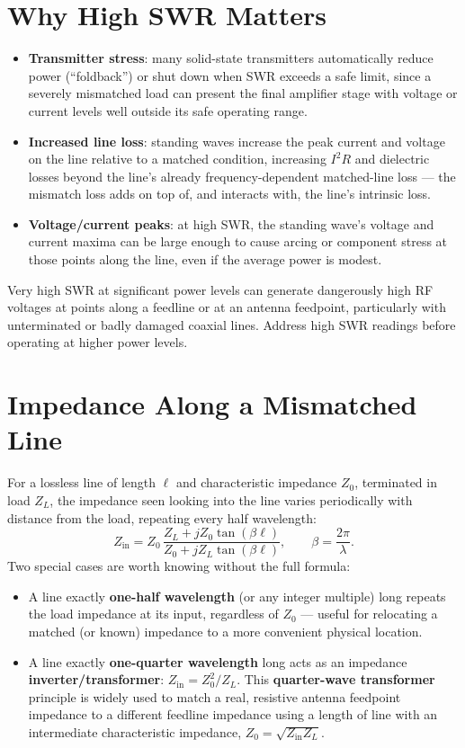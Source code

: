 \section{Why High SWR Matters}

\begin{itemize}
\item \textbf{Transmitter stress}: many solid-state transmitters
automatically reduce power (``foldback'') or shut down when SWR exceeds
a safe limit, since a severely mismatched load can present the final
amplifier stage with voltage or current levels well outside its safe
operating range.
\item \textbf{Increased line loss}: standing waves increase the peak
current and voltage on the line relative to a matched condition,
increasing $I^2R$ and dielectric losses beyond the line's already
frequency-dependent matched-line loss --- the mismatch loss adds on top
of, and interacts with, the line's intrinsic loss.
\item \textbf{Voltage/current peaks}: at high SWR, the standing wave's
voltage and current maxima can be large enough to cause arcing or
component stress at those points along the line, even if the average
power is modest.
\end{itemize}

\begin{safetynote}
Very high SWR at significant power levels can generate dangerously high
RF voltages at points along a feedline or at an antenna feedpoint,
particularly with unterminated or badly damaged coaxial lines. Address
high SWR readings before operating at higher power levels.
\end{safetynote}

\section{Impedance Along a Mismatched Line}

For a lossless line of length $\ell$ and characteristic impedance
$Z_0$, terminated in load $Z_L$, the impedance seen looking into the
line varies periodically with distance from the load, repeating every
half wavelength:
\[
Z_{\text{in}} = Z_0\,\frac{Z_L + jZ_0\tan(\beta\ell)}{Z_0 + jZ_L\tan(\beta\ell)}, \qquad \beta = \frac{2\pi}{\lambda}.
\]
Two special cases are worth knowing without the full formula:

\begin{itemize}
\item A line exactly \textbf{one-half wavelength} (or any integer
multiple) long repeats the load impedance at its input, regardless of
$Z_0$ --- useful for relocating a matched (or known) impedance to a more
convenient physical location.
\item A line exactly \textbf{one-quarter wavelength} long acts as an
impedance \textbf{inverter/transformer}: $Z_{\text{in}} = Z_0^2/Z_L$.
This \textbf{quarter-wave transformer} principle is widely used to
match a real, resistive antenna feedpoint impedance to a different
feedline impedance using a length of line with an intermediate
characteristic impedance, $Z_0 = \sqrt{Z_{\text{in}}Z_L}$.
\end{itemize}

